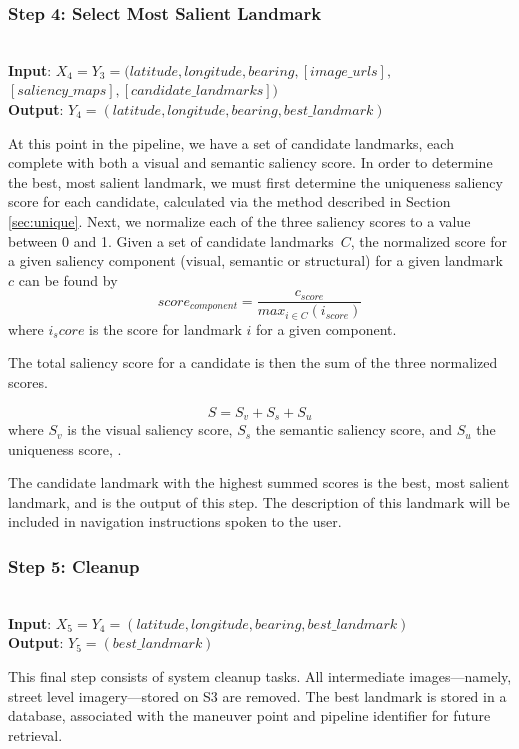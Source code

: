 \subsubsection*{Step 4: Select Most Salient Landmark}~\\
\noindent\textbf{Input}: $X_4 = Y_3 = (latitude, longitude, bearing,  [image\_urls],$\\ $[saliency\_maps], [candidate\_landmarks] )$\\
\textbf{Output}: $Y_4 = (latitude, longitude, bearing, best\_landmark)$ 

At this point in the pipeline, we have a set of candidate landmarks, each complete with both a visual and semantic saliency score. In order to determine the best, most salient landmark, we must first determine the uniqueness saliency score for each candidate, calculated via the method described in Section \ref{sec:unique}. Next, we normalize each of the three saliency scores to a value between 0 and 1. Given a set of candidate landmarks~$C$, the normalized score for a given saliency component (visual, semantic or structural) for a given landmark $c$ can be found by
\begin{equation}
    score_{component} = \frac{c_{score}}{max_{i \in C}(i_{score})}
\end{equation}
where $i_score$ is the score for landmark $i$ for a given component.

The total saliency score for a candidate is then the sum of the three normalized scores. 

\begin{equation}\label{eq:saliency}
    S = S_v + S_s + S_u
\end{equation}
where $S_v$ is the visual saliency score, $S_s$ the semantic saliency score, and $S_u$ the uniqueness score, .

The candidate landmark with the highest summed scores is the best, most salient landmark, and is the output of this step. The description of this landmark will be included in navigation instructions spoken to the user.

\subsubsection*{Step 5: Cleanup}~\\
\noindent\textbf{Input}: $X_5 = Y_4 = (latitude, longitude, bearing, best\_landmark)$\\
\textbf{Output}: $Y_5 = (best\_landmark)$

This final step consists of system cleanup tasks. All intermediate images---namely, street level imagery---stored on S3 are removed. The best landmark is stored in a database, associated with the maneuver point and pipeline identifier for future retrieval.

